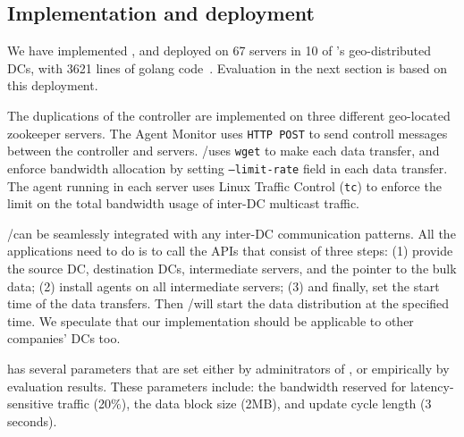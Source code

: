 \subsection{Implementation and deployment}
\label{sec:deployment}

We have implemented \NEW{\name/\newname}, and deployed on 67 servers in 10 of
\company's geo-distributed DCs, with 3621 lines of
golang code~\cite{golang}. Evaluation in the next section is
based on this deployment.

The duplications of the controller are implemented on three different
geo-located zookeeper servers. The Agent Monitor uses \texttt{HTTP
POST} to send controll messages between the controller and servers.
\name/\newname uses \texttt{wget} to make each data transfer, and enforce
bandwidth allocation by setting \texttt{--limit-rate} field in each
data transfer. The agent running in each server uses Linux Traffic
Control (\texttt{tc}) to enforce the limit on the total bandwidth
usage of inter-DC multicast traffic.

\name/\newname can be seamlessly integrated with any inter-DC communication
patterns. All the applications need to do is to call the APIs
that consist of three steps: (1) provide the source DC,
destination DCs, intermediate servers, and the pointer to the bulk
data; (2) install agents on all intermediate servers; (3) and
finally, set the start time of the data transfers. Then \name/\newname will
start the data distribution at the specified time. We speculate that
our implementation should be applicable to other companies' DCs too.

\name has several parameters that are set either by adminitrators of
\company, or empirically by evaluation results. These parameters
include: the bandwidth reserved for latency-sensitive traffic (20\%),
the data block size (2MB), and update cycle length (3 seconds). 

